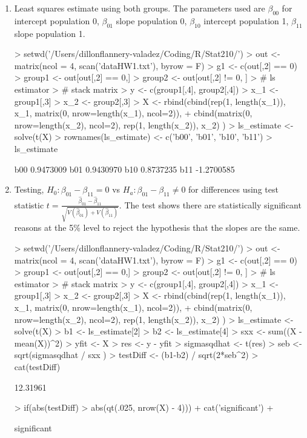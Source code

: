\documentclass{article}
\begin{document}
\begin{enumerate}
\item Least squares estimate using both groups. The parameters used are $ \beta_{00} $ for intercept population 0, $\beta_{01}$ slope population 0, $\beta_{10}$ intercept population 1, $\beta_{11}$ slope population 1.  
\begin{Schunk}
\begin{Sinput}
> setwd('/Users/dillonflannery-valadez/Coding/R/Stat210/')
> out <-  matrix(ncol = 4, scan('dataHW1.txt'), byrow = F)
> g1 <- c(out[,2] == 0)
> group1 <- out[out[,2] == 0,]
> group2 <- out[out[,2] != 0, ]
> # ls estimator
> # stack matrix 
> y <- c(group1[,4], group2[,4])
> x_1 <- group1[,3]
> x_2 <- group2[,3]
> X <- rbind(cbind(rep(1, length(x_1)), x_1, matrix(0, nrow=length(x_1), ncol=2)),
+       cbind(matrix(0, nrow=length(x_2), ncol=2), rep(1, length(x_2)), x_2)  )
> ls_estimate <- solve(t(X) %*% X) %*% (t(X) %*% y)
> rownames(ls_estimate) <- c('b00', 'b01', 'b10', 'b11')
> ls_estimate
\end{Sinput}
\begin{Soutput}
          [,1]
b00  0.9473009
b01  0.9430970
b10  0.8737235
b11 -1.2700585
\end{Soutput}
\end{Schunk}
\item Testing, $H_0: \beta_{01} - \beta_{11} = 0 $ vs $H_a: \beta_{01} - \beta_{11} \neq 0 $ for differences using test statistic $ t = \frac{\hat{\beta}_{01} - \hat{\beta}_{11} } {\sqrt{ V(\hat{\beta}_{01}) + V(\hat{\beta}_{11}) } }  $. The test shows there are statistically significant reasons at the 5\% level to reject the hypothesis that the slopes are the same.
\begin{Schunk}
\begin{Sinput}
> setwd('/Users/dillonflannery-valadez/Coding/R/Stat210/')
> out <-  matrix(ncol = 4, scan('dataHW1.txt'), byrow = F)
> g1 <- c(out[,2] == 0)
> group1 <- out[out[,2] == 0,]
> group2 <- out[out[,2] != 0, ]
> # ls estimator
> # stack matrix 
> y <- c(group1[,4], group2[,4])
> x_1 <- group1[,3]
> x_2 <- group2[,3]
> X <- rbind(cbind(rep(1, length(x_1)), x_1, matrix(0, nrow=length(x_1), ncol=2)),
+       cbind(matrix(0, nrow=length(x_2), ncol=2), rep(1, length(x_2)), x_2)  )
> ls_estimate <- solve(t(X) %*% X) %*% (t(X) %*% y)
> b1 <- ls_estimate[2]
> b2 <- ls_estimate[4]
> sxx <- sum((X - mean(X))^2)
> yfit <- X %*% ls_estimate
> res <- y - yfit
> sigmasqdhat <- t(res) %*% res / (nrow(X) - 4)
> seb <- sqrt(sigmasqdhat / sxx )
> testDiff <- (b1-b2) / sqrt(2*seb^2)
> cat(testDiff)
\end{Sinput}
\begin{Soutput}
12.31961
\end{Soutput}
\begin{Sinput}
> if(abs(testDiff) > abs(qt(.025, nrow(X) - 4))){
+   cat('significant')
+ }
\end{Sinput}
\begin{Soutput}
significant
\end{Soutput}
\end{Schunk}
\end{enumerate}
\end{document}
